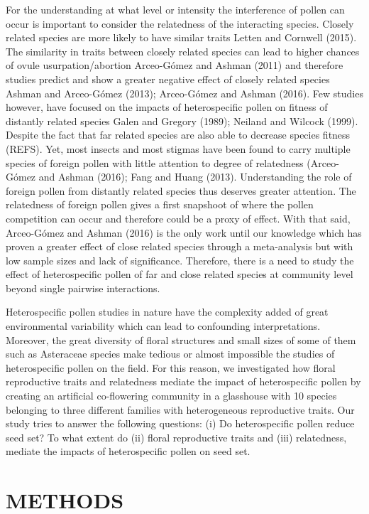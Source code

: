 \documentclass[11pt,a4paper]{article}
\begin{document}
For the understanding at what level or intensity the interference of
pollen can occur is important to consider the relatedness of the
interacting species. Closely related species are more likely to have
similar traits Letten and Cornwell (2015). The similarity in traits
between closely related species can lead to higher chances of ovule
usurpation/abortion Arceo-Gómez and Ashman (2011) and therefore studies
predict and show a greater negative effect of closely related species
Ashman and Arceo-Gómez (2013); Arceo-Gómez and Ashman (2016). Few
studies however, have focused on the impacts of heterospecific pollen on
fitness of distantly related species Galen and Gregory (1989); Neiland
and Wilcock (1999). Despite the fact that far related species are also
able to decrease species fitness (REFS). Yet, most insects and most
stigmas have been found to carry multiple species of foreign pollen with
little attention to degree of relatedness (Arceo-Gómez and Ashman
(2016); Fang and Huang (2013). Understanding the role of foreign pollen
from distantly related species thus deserves greater attention. The
relatedness of foreign pollen gives a first snapshoot of where the
pollen competition can occur and therefore could be a proxy of effect.
With that said, Arceo-Gómez and Ashman (2016) is the only work until our
knowledge which has proven a greater effect of close related species
through a meta-analysis but with low sample sizes and lack of
significance. Therefore, there is a need to study the effect of
heterospecific pollen of far and close related species at community
level beyond single pairwise interactions.

Heterospecific pollen studies in nature have the complexity added of
great environmental variability which can lead to confounding
interpretations. Moreover, the great diversity of floral structures and
small sizes of some of them such as Asteraceae species make tedious or
almost impossible the studies of heterospecific pollen on the field. For
this reason, we investigated how floral reproductive traits and
relatedness mediate the impact of heterospecific pollen by creating an
artificial co-flowering community in a glasshouse with 10 species
belonging to three different families with heterogeneous reproductive
traits. Our study tries to answer the following questions: (i) Do
heterospecific pollen reduce seed set? To what extent do (ii) floral
reproductive traits and (iii) relatedness, mediate the impacts of
heterospecific pollen on seed set.

\section{METHODS}\label{methods}
\end{document}
